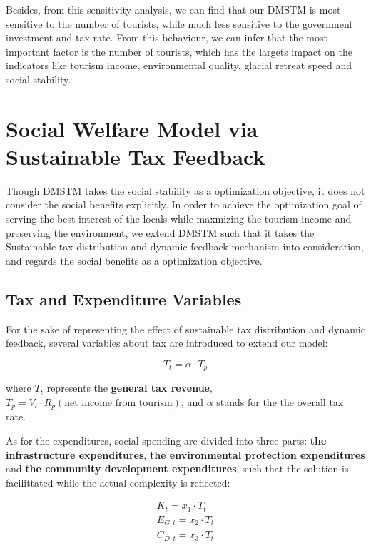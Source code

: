 \documentclass{mcmthesis}
\begin{document}
Besides, from this sensitivity analysis, we can find that our DMSTM is most sensitive to 
the number of tourists, while much less sensitive to the government investment and tax rate.
From this behaviour, we can infer that the most important factor is the number of tourists, 
which has the largets impact on the indicators like tourism income, environmental quality, 
glacial retreat speed and social stability.

\section{Social Welfare Model via Sustainable Tax Feedback}
Though DMSTM takes the social stability as a optimization objective, it does not consider the social benefits explicitly. 
In order to achieve the optimization goal of serving the best interest of the locals while maxmizing the tourism income 
and preserving the environment, we extend DMSTM such that it takes the Sustainable tax distribution and dynamic feedback mechanism\cite{bayer2004sterman}
into consideration, and regards the social benefits as a optimization objective.

\subsection{Tax and Expenditure Variables}
For the sake of representing the effect of sustainable tax distribution and dynamic feedback, 
several variables about tax are introduced to extend our model:

\begin{equation}
  T_t = \alpha \cdot T_p
\end{equation}

where $T_t$ represents the \textbf{general tax revenue}, $T_p = V_t \cdot R_p (\text{net income from tourism})$, 
and $\alpha$ stands for the the overall tax rate.

As for the expenditures, social spending are divided into three parts: \textbf{the infrastructure expenditures}, 
\textbf{the environmental protection expenditures} and \textbf{the community development expenditures}, 
such that the solution is facilittated while the actual complexity is reflected:

\begin{gather}
  K_t = x_1 \cdot T_t  \\
  E_{G,t} = x_2 \cdot T_t  \\
  C_{D,t} = x_3 \cdot T_t 
\end{gather}
\end{document}
